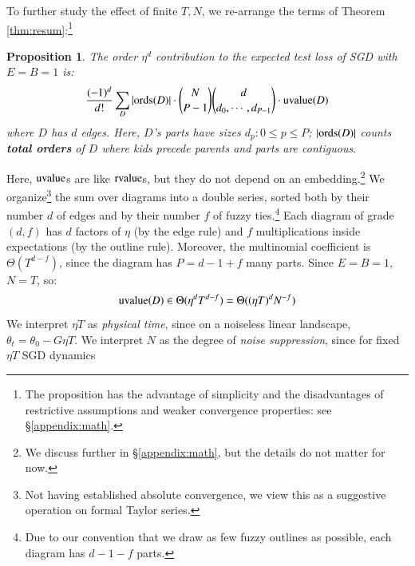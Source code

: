 \documentclass[openany, notitlepage, justified]{tufte-book}
\theoremstyle{plain}
\newtheorem{prop}{Proposition}
\theoremstyle{definition}
\newcommand{\uvalue}{\text{\textnormal{uvalue}}}
\newcommand{\rvalue}{\text{\textnormal{rvalue}}}
\newcommand{\ords}{\text{\textnormal{ords}}}
\begin{document}
            To further study the effect of finite $T,N$, we
            re-arrange the terms of Theorem \ref{thm:resum}:\footnote{
                The proposition has the advantage of simplicity
                and the disadvantages of restrictive assumptions and weaker
                convergence properties: see \S\ref{appendix:math}.
            }
            \begin{prop} \label{prop:vanilla}
                The order $\eta^d$ contribution to the expected test loss of
                 SGD with $E=B=1$ is:
                \begin{equation*}\label{eq:sgdbasiccoef}
                    \frac{(-1)^d}{d!} \sum_{D} 
                    |\ords(D)| \cdot
                    {N \choose P-1} {d \choose d_0,\cdots,d_{P-1}} \cdot
                    \uvalue(D)
                \end{equation*}
                where $D$ has $d$ edges.  Here, $D$'s parts
                have sizes $d_p: 0\leq p\leq P$; $|\ords(D)|$ counts
                \textbf{total orders} of $D$ where kids precede parents
                and parts are contiguous.
            \end{prop}
            Here, $\uvalue$s are like $\rvalue$s, but they do not depend on an
            embedding.\footnote{We discuss further in \S\ref{appendix:math}, but
            the details do not matter for now.}  We organize\footnote{
                Not having established absolute convergence, we view this
                as a suggestive operation on formal Taylor series.
            } the sum over
            diagrams into a double series, sorted both by their number
            $d$ of edges and by their number $f$ of
            fuzzy ties.\footnote{
                Due to our convention that we draw as few fuzzy outlines as
                possible, each diagram has $d-1-f$ parts. 
            } Each diagram of grade $(d,f)$ has $d$ factors of $\eta$ (by
            the edge rule) and $f$ multiplications inside expectations (by the
            outline rule).  Moreover, the multinomial coefficient is
            $\Theta(T^{d-f})$, since the diagram has $P=d-1+f$ many parts.
            Since $E=B=1$, $N=T$, so:
            $$
                \uvalue(D) \in \Theta(\eta^d T^{d-f})
                = \Theta((\eta T)^d N^{-f})
            $$
            We interpret $\eta T$ as \emph{physical time}, since on a noiseless
            linear landscape, $\theta_t = \theta_0 - G \eta
            T$.  We interpret $N$ as the degree of \emph{noise suppression},
            since for fixed $\eta T$ SGD dynamics
\end{document}
